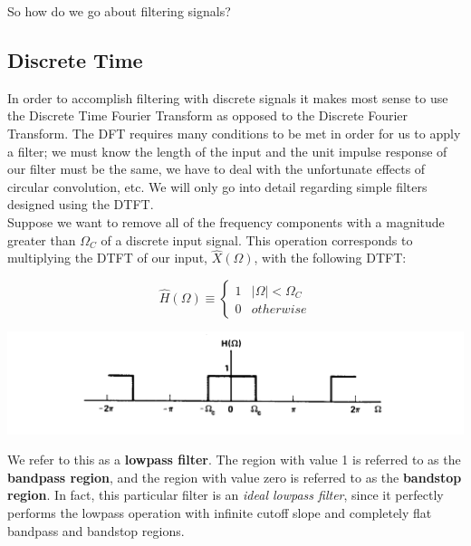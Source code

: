\documentclass[a4paper]{article}
\numberwithin{equation}{section}
\begin{document}
So how do we go about filtering signals?

\subsection{Discrete Time}
In order to accomplish filtering with discrete signals it makes most sense to use the Discrete Time Fourier Transform as opposed to the Discrete Fourier Transform. The DFT requires many conditions to be met in order for us to apply a filter; we must know the length of the input and the unit impulse response of our filter must be the same, we have to deal with the unfortunate effects of circular convolution, etc. We will only go into detail regarding simple filters designed using the DTFT. \\

Suppose we want to remove all of the frequency components with a magnitude greater than $\Omega_C$ of a discrete input signal. This operation corresponds to multiplying the DTFT of our input, $\hat{X}(\Omega)$, with the following DTFT:

\begin{equation}
\hat{H}(\Omega) \equiv
\begin{cases} 
      1 & |\Omega| < \Omega_C \\
      0 & otherwise
\end{cases}
\end{equation}

\begin{center}
\includegraphics[scale=0.39]{lowpass_ideal_omega.png}
\end{center}

We refer to this as a \textbf{lowpass filter}. The region with value 1 is referred to as the \textbf{bandpass region}, and the region with value zero is referred to as the \textbf{bandstop region}. In fact, this particular filter is an \textit{ideal lowpass filter}, since it perfectly performs the lowpass operation with infinite cutoff slope and completely flat bandpass and bandstop regions.\\
\smallskip
\end{document}
